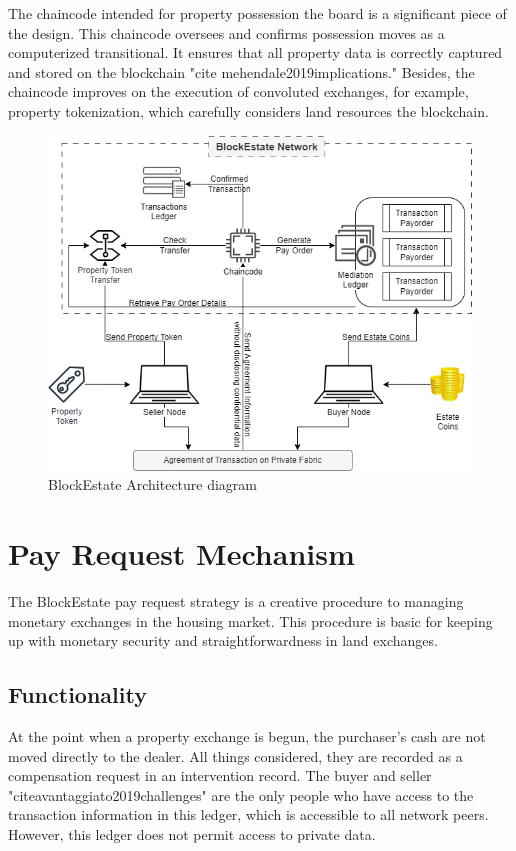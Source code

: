 \documentclass[3p,times]{elsarticle}
\begin{document}
The chaincode intended for property possession the board is a significant piece of the design. This chaincode oversees and confirms possession moves as a computerized transitional. It ensures that all property data is correctly captured and stored on the blockchain "cite mehendale2019implications." Besides, the chaincode improves on the execution of convoluted exchanges, for example, property tokenization, which carefully considers land resources the blockchain.


\begin{figure}[H]
    \centering
    \includegraphics[width=1\linewidth]{images/Bllockchain.drawio.png}
    \caption{BlockEstate Architecture diagram}
    \label{fig:fig1}
\end{figure}


\section{Pay Request Mechanism}

The BlockEstate pay request strategy is a creative procedure to managing monetary exchanges in the housing market. This procedure is basic for keeping up with monetary security and straightforwardness in land exchanges.

\subsection{Functionality}

At the point when a property exchange is begun, the purchaser's cash are not moved directly to the dealer. All things considered, they are recorded as a compensation request in an intervention record. The buyer and seller "citeavantaggiato2019challenges" are the only people who have access to the transaction information in this ledger, which is accessible to all network peers. However, this ledger does not permit access to private data.
\end{document}
